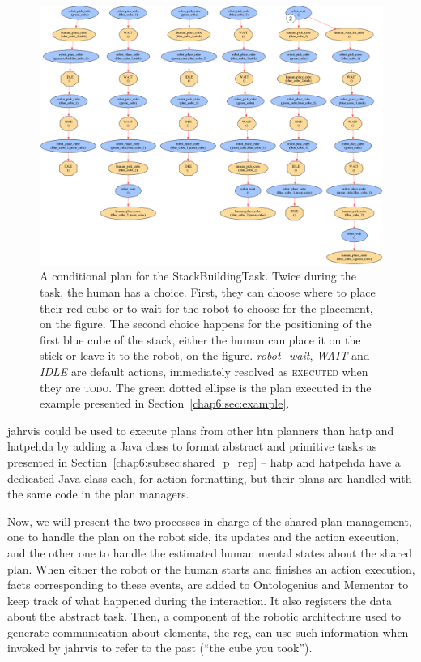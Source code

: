 \documentclass[a4paper,11pt,twoside]{StyleThese}
\begin{document}
\begin{landscape}
	\thispagestyle{example}
	\begin{figure}[!hp]
		\centering
		\includegraphics[scale=0.31]{figures/chapter2/plan_building2.png}
		\caption{A conditional plan for the StackBuildingTask. Twice during the task, the human has a choice. First, they can choose where to place their red cube or to wait for the robot to choose for the placement,  on the figure. The second choice happens for the positioning of the first blue cube of the stack, either the human can place it on the stick or leave it to the robot,  on the figure. \textit{robot\_wait}, \textit{WAIT} and \textit{IDLE} are default actions, immediately resolved as \textsc{executed} when they are \textsc{todo}. The green dotted ellipse is the plan executed in the example presented in Section~\ref{chap6:sec:example}.}
		\label{chap6:fig:plan_building2}
	\end{figure}
\end{landscape}
\restoregeometry

\bigskip
\acrshort{jahrvis} could be used to execute plans from other \acrshort{htn} planners than \acrshort{hatp} and \acrshort{hatpehda} by adding a Java class to format abstract and primitive tasks as presented in Section~\ref{chap6:subsec:shared_p_rep} -- \acrshort{hatp} and \acrshort{hatpehda} have a dedicated Java class each, for action formatting, but their plans are handled with the same code in the plan managers.

Now, we will present the two processes in charge of the shared plan management, one to handle the plan on the robot side, \ie its updates and the action execution, and the other one to handle the estimated human mental states about the shared plan. When either the robot or the human starts and finishes an action execution, facts corresponding to these events, are added to Ontologenius and Mementar to keep track of what happened during the interaction. It also registers the data about the abstract task. Then, a component of the robotic architecture used to generate communication about elements, the \acrfull{reg}, can use such information when invoked by \acrshort{jahrvis} to refer to the past (\eg ``the cube you took'').
\end{document}
